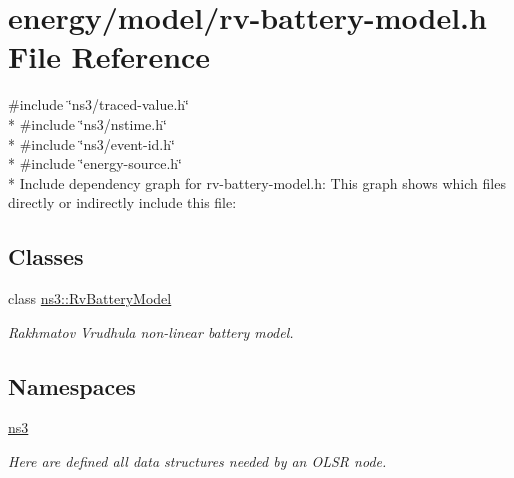 \hypertarget{rv-battery-model_8h}{}\section{energy/model/rv-\/battery-\/model.h File Reference}
\label{rv-battery-model_8h}
{\ttfamily \#include \char`\"{}ns3/traced-\/value.\+h\char`\"{}}\\*
{\ttfamily \#include \char`\"{}ns3/nstime.\+h\char`\"{}}\\*
{\ttfamily \#include \char`\"{}ns3/event-\/id.\+h\char`\"{}}\\*
{\ttfamily \#include \char`\"{}energy-\/source.\+h\char`\"{}}\\*
Include dependency graph for rv-\/battery-\/model.h\+:
This graph shows which files directly or indirectly include this file\+:
\subsection*{Classes}
\begin{DoxyCompactItemize}
\item 
class \hyperlink{classns3_1_1RvBatteryModel}{ns3\+::\+Rv\+Battery\+Model}
\begin{DoxyCompactList}\small\item\em Rakhmatov Vrudhula non-\/linear battery model. \end{DoxyCompactList}\end{DoxyCompactItemize}
\subsection*{Namespaces}
\begin{DoxyCompactItemize}
\item 
 \hyperlink{namespacens3}{ns3}
\begin{DoxyCompactList}\small\item\em Here are defined all data structures needed by an O\+L\+SR node. \end{DoxyCompactList}\end{DoxyCompactItemize}
